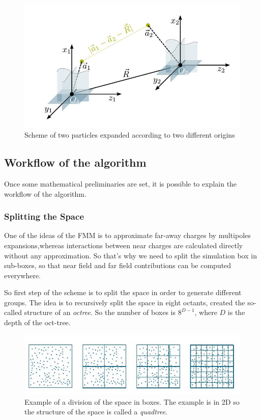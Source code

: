 \documentclass[10pt,twoside,a4paper]{report}
\begin{document}
	\begin{figure}[H]

    \includegraphics[scale=0.7]{bipolar}
    \centering 
    \caption{Scheme of two particles expanded according to two different origins}
    \label{fig:bipolar}
    \end{figure}




	
	\subsection{Workflow of the algorithm}
	
	Once some mathematical preliminaries are set, it is possible to explain the workflow of the algorithm.
	
	\subsubsection{Splitting the Space}
	
	One of the ideas of the FMM is to approximate far-away charges by multipoles expansions,whereas interactions between near charges are calculated directly without any approximation. So that's why we need to split the simulation box in sub-boxes, so that near field and far field contributions can be computed everywhere. 	
	
	So first step of the scheme is to split the space in order to generate different groups. The idea is to recursively split the space in eight octants, created the so-called structure of an \textit{octree}. So the number of boxes is $8^{D-1}$, where $D$ is the depth of the oct-tree.
	
		
	
	\begin{figure}[H]
	    
    \includegraphics[scale=0.9]{BoxDepth}    
    \centering 
    \caption{Example of a division of the space in boxes. The  example is in 2D so the structure of the space is called a \textit{quadtree}.}
    \label{fig:depth}       
     \end{figure}
	
\end{document}

